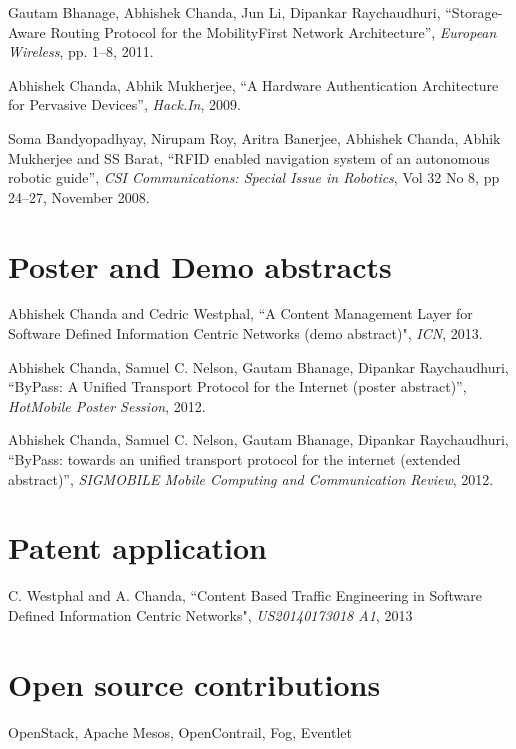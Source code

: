 \documentclass[margin,line]{resume}
\begin{document}
\begin{resume}
\vspace{-2mm}
    Gautam Bhanage, Abhishek Chanda, Jun Li, Dipankar Raychaudhuri,
    ``Storage-Aware Routing Protocol for the MobilityFirst Network Architecture'',
    \textsl{European Wireless}, pp. 1--8, 2011.

\vspace{-2mm}
   Abhishek Chanda, Abhik Mukherjee,
    ``A Hardware Authentication Architecture for Pervasive Devices'',
    \textsl{Hack.In},  2009.

\vspace{-2mm}
    Soma Bandyopadhyay, Nirupam Roy, Aritra Banerjee, Abhishek Chanda, Abhik Mukherjee and SS Barat,
    ``RFID enabled navigation system of an autonomous robotic guide'',
    \textsl{CSI Communications: Special Issue in Robotics}, Vol 32 No 8, pp 24--27, November 2008.


\section{\mysidestyle Poster and Demo abstracts}
Abhishek Chanda and Cedric Westphal, ``A Content Management Layer for Software Defined Information Centric Networks (demo abstract)", \textsl{ICN}, 2013.

 \vspace{-2mm}
    Abhishek Chanda, Samuel C. Nelson, Gautam Bhanage, Dipankar Raychaudhuri,
    ``ByPass: A Unified Transport Protocol for the Internet (poster abstract)'',
    \textsl{HotMobile Poster Session},  2012.

\vspace{-2mm}
Abhishek Chanda, Samuel C. Nelson, Gautam Bhanage, Dipankar Raychaudhuri,
    ``ByPass: towards an unified transport protocol for the internet (extended abstract)'',
    \textsl{SIGMOBILE Mobile Computing and Communication Review},  2012.



\section{\mysidestyle Patent application}
C. Westphal and A. Chanda, ``Content Based Traffic Engineering in Software Defined Information Centric Networks", \textsl{US20140173018 A1}, 2013

\section{\mysidestyle Open source contributions}
OpenStack, Apache Mesos, OpenContrail, Fog, Eventlet


\end{resume}
\end{document}

